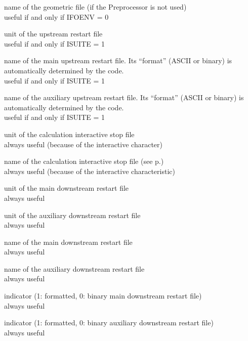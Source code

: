 {name of the geometric file (if the Preprocessor is not used)\\
useful if and only if IFOENV = 0}

{unit of the upstream restart file\\
useful if and only if ISUITE = 1}

{name of the main upstream restart file. Its ``format'' (ASCII or binary)
is automatically determined by the code.\\
useful if and only if ISUITE = 1}

{name of the auxiliary upstream restart file. Its ``format'' (ASCII or binary)
is automatically determined by the code.\\
useful if and only if ISUITE = 1}

{unit of the calculation interactive stop file\\
always useful (because of the interactive character)}

{name of the calculation interactive stop file (see p.\pageref{prg_ficstp})\\
always useful (because of the interactive characteristic)}

{unit of the main downstream restart file\\
always useful}

{unit of the auxiliary downstream restart file\\
always useful}

{name of the main downstream restart file\\
always useful}

{name of the auxiliary downstream restart file\\
always useful}

{indicator (1: formatted, 0: binary main downstream restart file)\\
always useful}

{indicator (1: formatted, 0: binary auxiliary downstream restart file)\\
always useful}


